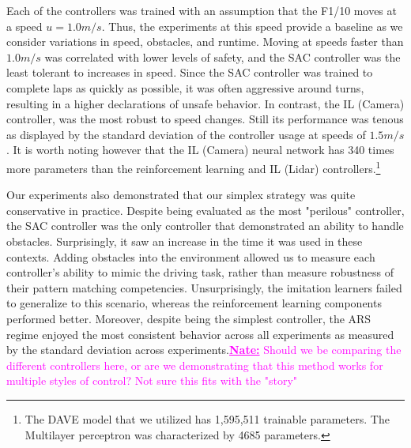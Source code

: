 \documentclass[manuscript,screen,review]{acmart}
\newcommand{\nate}[1]{\textcolor{magenta}{\textbf{\underline{Nate:}} #1}}
\begin{document}
Each of the controllers was trained with an assumption that the F1/10 moves at a speed $u=1.0 m/s$. Thus, the experiments at this speed provide a baseline as we consider variations in speed, obstacles, and runtime. Moving at speeds faster than $1.0 m/s$ was correlated with lower levels of safety, and the SAC controller was the least tolerant to increases in speed. Since the SAC controller was trained to complete laps as quickly as possible, it was often aggressive around turns, resulting in a higher declarations of unsafe behavior. In contrast, the IL (Camera) controller, was the most robust to speed changes. Still its performance was tenous as displayed by the standard deviation of the controller usage at speeds of $1.5 m/s$. It is worth noting however that the IL (Camera) neural network has 340 times more parameters than the reinforcement learning and IL (Lidar) controllers.\footnote{The DAVE model that we utilized has 1,595,511 trainable parameters. The Multilayer perceptron was characterized by 4685 parameters.}


Our experiments also demonstrated that our simplex strategy was quite conservative in practice. Despite being evaluated as the most "perilous" controller, the SAC controller was the only controller that demonstrated an ability to handle obstacles. Surprisingly, it saw an increase in the time it was used in these contexts. Adding obstacles into the environment allowed us to measure each controller's ability to mimic the driving task, rather than measure robustness of their pattern matching competencies. Unsurprisingly, the imitation learners failed to generalize to this scenario, whereas the reinforcement learning components performed better. Moreover, despite being the simplest controller, the ARS regime enjoyed the most consistent behavior across all experiments as measured by the standard deviation across experiments.\nate{Should we be comparing the different controllers here, or are we demonstrating that this method works for multiple styles of control? Not sure this fits with the "story"}
\end{document}
